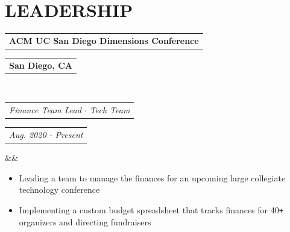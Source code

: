 \documentclass[11pt,letterpaper,sans]{moderncv}        %
\makeatletter
\newcommand*{\customcventry}[7][.25em]{
  \begin{tabular}{@{}l} 
    {\bfseries #4}
  \end{tabular}
  \hfill%
  \begin{tabular}{l@{}}
     {\bfseries #5}
  \end{tabular} \\
  \begin{tabular}{@{}l} 
    {\itshape #3}
  \end{tabular}
  \hfill%
  \begin{tabular}{l@{}}
     {\itshape #2}
  \end{tabular}
  \ifx&#7&%
  \else{\\%
    \begin{minipage}{\maincolumnwidth}%
      #7%
    \end{minipage}}\fi%
  \par\addvspace{#1}}
\makeatother
\begin{document}
\vspace*{-4mm}

\section{LEADERSHIP}
\customcventry{Aug. 2020 - Present}{Finance Team Lead $\cdot$ Tech Team}{ACM UC San Diego Dimensions Conference}{San Diego, CA}{e}{}
\begin{itemize}
    \item Leading a team to manage the finances for an upcoming large collegiate technology conference
    \item Implementing a custom budget spreadsheet that tracks finances for 40\texttt{+} organizers and directing fundraisers
\end{itemize}

\nocite{*}



\end{document}
